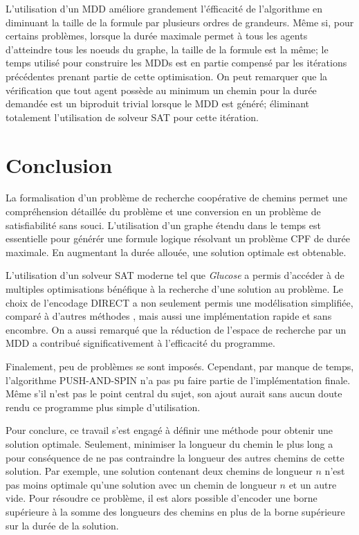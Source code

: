 \documentclass[french, 12pt, letterpaper]{article}
\theoremstyle{definition}
\theoremstyle{proposition}
\theoremstyle{example}
\begin{document}
    L'utilisation d'un MDD améliore grandement l'éfficacité de l'algorithme en diminuant la taille de la formule par plusieurs
    ordres de grandeurs. Même si, pour certains problèmes, lorsque la durée maximale permet à tous les agents d'atteindre tous les noeuds
    du graphe, la taille de la formule est la même; le temps utilisé pour construire les MDDs est en partie compensé par les itérations précédentes
    prenant partie de cette optimisation. On peut remarquer que la vérification que tout agent possède au minimum un chemin pour 
    la durée demandée est un biproduit trivial lorsque le MDD est généré; éliminant totalement l'utilisation de solveur SAT pour cette itération. 

    \newpage
    \section*{Conclusion}

    La formalisation d'un problème de recherche coopérative de chemins permet une compréhension détaillée du problème
    et une conversion en un problème de satisfiabilité sans souci. L'utilisation d'un graphe étendu dans
    le temps est essentielle pour générér une formule logique résolvant un problème CPF de durée maximale. 
    En augmentant la durée allouée, une solution optimale est obtenable.

    L'utilisation d'un solveur SAT moderne tel que \emph{Glucose} a permis d'accéder à de multiples optimisations bénéfique
    à la recherche d'une solution au problème. Le choix de l'encodage DIRECT a non seulement permis une modélisation simplifiée, comparé à d'autres
    méthodes \cite{PSUR16}, mais aussi une implémentation rapide et sans encombre. On a aussi remarqué que la réduction de l'espace
    de recherche par un MDD a contribué significativement à l'efficacité du programme.

    Finalement, peu de problèmes se sont imposés. Cependant, par manque de temps, l'algorithme PUSH-AND-SPIN \cite{PAS} n'a pas pu faire partie de
    l'implémentation finale. Même s'il n'est pas le point central du sujet, son ajout aurait sans aucun doute rendu ce programme
    plus simple d'utilisation.

    Pour conclure, ce travail s'est engagé à définir une méthode pour obtenir une solution optimale. 
    Seulement, minimiser la longueur du chemin le plus long a pour conséquence de ne pas contraindre la longueur des autres chemins
    de cette solution. Par exemple, une solution contenant deux chemins de longueur $n$ n'est pas moins optimale qu'une solution 
    avec un chemin de longueur $n$ et un autre vide. Pour résoudre ce problème, il est alors possible d'encoder une borne supérieure
    à la somme des longueurs des chemins \cite{PSURTEG} en plus de la borne supérieure sur la durée de la solution.
\end{document}
